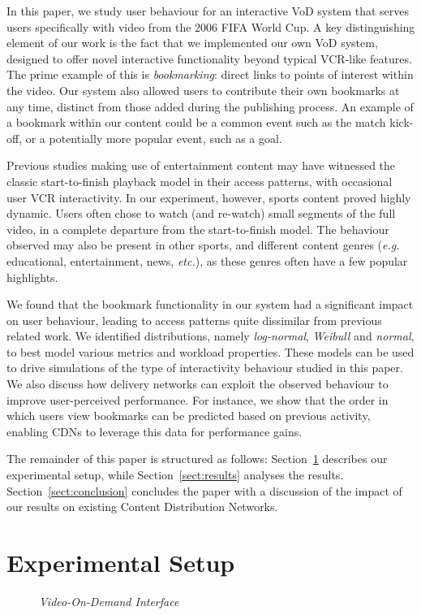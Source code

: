 \documentclass[letterpaper,nocopyrightspace]{sig-alternate}
\newcommand{\capttext}{\protect\centering\em}
\begin{document}
In this paper, we study user behaviour for an interactive VoD system
that serves users specifically with video from the 2006 FIFA World
Cup. A key distinguishing element of our work is the fact that we
implemented our own VoD system, designed to offer novel interactive
functionality beyond typical VCR-like features. The prime example of
this is \emph{bookmarking}: direct links to points of interest
within the video. Our system also allowed users to contribute their
own bookmarks at any time, distinct from those added during the
publishing process. An example of a bookmark within our content
could be a common event such as the match kick-off, or a potentially
more popular event, such as a goal.

Previous studies making use of entertainment content may have
witnessed the classic start-to-finish playback model in their access
patterns, with occasional user VCR interactivity. In our experiment,
however, sports content proved highly dynamic. Users often chose to
watch (and re-watch) small segments of the full video, in a complete
departure from the start-to-finish model. The behaviour observed may
also be present in other sports, and different content genres
(\emph{e.g.} educational, entertainment, news, \emph{etc.}), as
these genres often have a few popular highlights.

We found that the bookmark functionality in our system had a
significant impact on user behaviour, leading to access patterns
quite dissimilar from previous related work. We identified
distributions, namely {\em log-normal}, {\em Weibull} and {\em
normal}, to best model various metrics and workload properties.
These models can be used to drive simulations of the type of
interactivity behaviour studied in this paper. We also discuss how
delivery networks can exploit the observed behaviour to improve
user-perceived performance. For instance, we show that the order in
which users view bookmarks can be predicted based on previous
activity, enabling CDNs to leverage this data for performance gains.


The remainder of this paper is structured as follows:
Section~\ref{sect:methodology} describes our experimental setup,
while Section~\ref{sect:results} analyses the results.
Section~\ref{sect:conclusion} concludes the paper with a discussion
of the impact of our results on existing Content Distribution
Networks.

\section{Experimental Setup}
\label{sect:methodology}
\begin{figure}[tb]
\centering
{}
\caption{\capttext Video-On-Demand Interface}
\label{fig:server_setup}
\end{figure}
\end{document}
